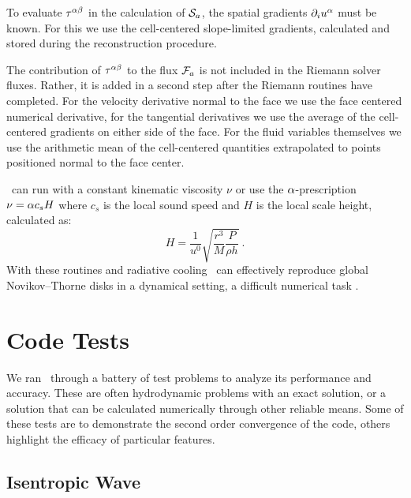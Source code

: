 To evaluate $\tau^{\alpha\beta}$ in the calculation of $\mathcal{S}_a$, the spatial gradients $\partial_i u^\alpha$ must be known.  For this we use the cell-centered slope-limited gradients, calculated and stored during the reconstruction procedure.

The contribution of $\tau^{\alpha\beta}$ to the flux $\mathcal{F}_a$ is not included in the Riemann solver fluxes.  Rather, it is added in a second step after the Riemann routines have completed.  For the velocity derivative normal to the face we use the face centered numerical derivative, for the tangential derivatives we use the average of the cell-centered gradients on either side of the face.  For the fluid variables themselves we use the arithmetic mean of the cell-centered quantities extrapolated to points positioned normal to the face center.

\grdisco\ can run with a constant kinematic viscosity $\nu$ or use the $\alpha$-prescription $\nu = \alpha c_s H$ where $c_s$ is the local sound speed and $H$ is the local scale height, calculated as:
\begin{equation}
	H = \frac{1}{u^0}\sqrt{\frac{r^3}{M}\frac{P}{\rho h}}\ .
\end{equation}
With these routines and radiative cooling \grdisco\ can effectively reproduce global Novikov--Thorne disks in a dynamical setting, a difficult numerical task \citep{Novikov73}.

\section{Code Tests}

We ran \grdisco\ through a battery of test problems to analyze its performance and accuracy.  These are often hydrodynamic problems with an exact solution, or a solution that can be calculated numerically through other reliable means.  Some of these tests are to demonstrate the second order convergence of the code, others highlight the efficacy of particular features.

\subsection{Isentropic Wave}

